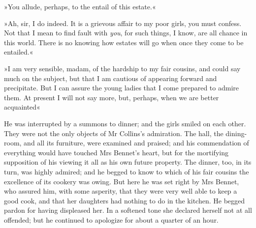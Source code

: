 »You allude, perhaps, to the entail of this estate.«

»Ah, sir, I do indeed. It is a grievous affair to my poor girls, you must confess. Not that I mean to find fault with \textit{you}, for such things, I know, are all chance in this world. There is no knowing how estates will go when once they come to be entailed.«

»I am very sensible, madam, of the hardship to my fair cousins, and could say much on the subject, but that I am cautious of appearing forward and precipitate. But I can assure the young ladies that I come prepared to admire them. At present I will not say more, but, perhaps, when we are better acquainted\longdash«

He was interrupted by a summons to dinner; and the girls smiled on each other. They were not the only objects of Mr Collins's admiration. The hall, the dining-room, and all its furniture, were examined and praised; and his commendation of everything would have touched Mrs Bennet's heart, but for the mortifying supposition of his viewing it all as his own future property. The dinner, too, in its turn, was highly admired; and he begged to know to which of his fair cousins the excellence of its cookery was owing. But here he was set right by Mrs Bennet, who assured him, with some asperity, that they were very well able to keep a good cook, and that her daughters had nothing to do in the kitchen. He begged pardon for having displeased her. In a softened tone she declared herself not at all offended; but he continued to apologize for about a quarter of an hour.